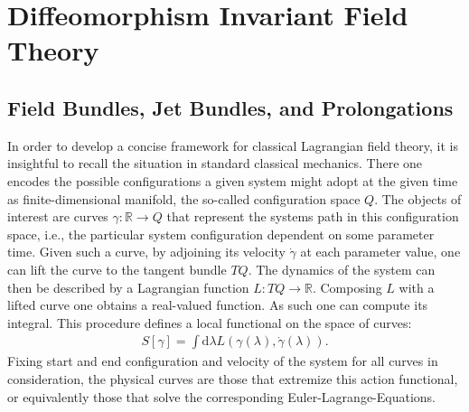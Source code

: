 \documentclass[a4paper,12pt, DIV=14, BCOR=5mm, twoside, headsepline, numbers=noenddot]{scrbook}
\begin{document}
\chapter{Diffeomorphism Invariant Field Theory}\label{chapter1}


\section{Field Bundles, Jet Bundles, and Prolongations}
In order to develop a concise framework for classical Lagrangian field theory, it is insightful to recall the situation in standard classical mechanics. There one encodes the possible configurations a given system might adopt at the given time as finite-dimensional manifold, the so-called configuration space $Q$. The objects of interest are curves $\gamma : \mathbb{R} \rightarrow Q $ that represent the systems path in this configuration space, i.e., the particular system configuration dependent on some parameter time. Given such a curve, by adjoining its velocity $\dot{\gamma}$ at each parameter value, one can lift the curve to the tangent bundle $TQ$. The dynamics of the system can then be described by a Lagrangian function $L : TQ \rightarrow \mathbb{R}$. Composing $L$ with a lifted curve one obtains a real-valued function. As such one can compute its integral. This procedure defines a local functional on the space of curves:
\begin{align}
S[\gamma] = \int \mathrm{d}\lambda L(\gamma (\lambda), \dot{\gamma} (\lambda)).  
\end{align}
Fixing start and end configuration and velocity of the system for all curves in consideration, the physical curves are those that extremize this action functional, or equivalently those that solve the corresponding Euler-Lagrange-Equations. 
\end{document}
